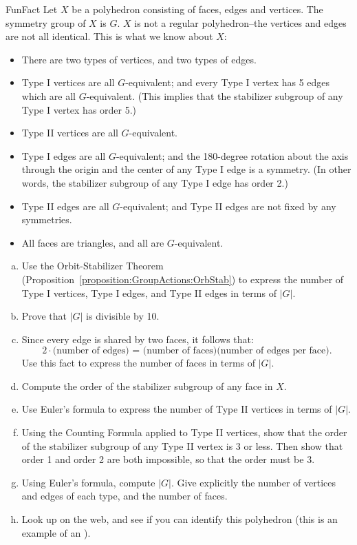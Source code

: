 \begin{exercise}{FunFact}
Let $X$ be a polyhedron consisting of faces, edges and vertices. The symmetry group of $X$ is $G$. $X$ is not a regular polyhedron--the vertices and edges are not all identical.  This is what we know about $X$:
\begin{itemize}
\item
There are two types of vertices, and two types of edges. 
\item Type I vertices are all $G$-equivalent; and every Type I vertex has 5 edges which are all $G$-equivalent. (This implies that the stabilizer subgroup of any Type I vertex has order 5.)
\item Type II vertices are all $G$-equivalent.
\item Type I edges are all $G$-equivalent; and the 180-degree rotation about the axis through the origin and the center of any Type I edge is a symmetry. (In other words, the stabilizer subgroup  of any Type I edge has order 2.)
\item Type II edges are all $G$-equivalent; and Type II edges are not fixed by any symmetries.
\item All faces are triangles, and all are $G$-equivalent.
\end{itemize}
\begin{enumerate}[(a)]
\item 
Use the Orbit-Stabilizer Theorem  (Proposition~\ref{proposition:GroupActions:OrbStab}) to express the number of Type I vertices, Type I  edges, and Type II edges in terms of $|G|$.
\item 
Prove that $|G|$ is divisible by 10.
\item
Since every edge is shared by two faces, it follows that:
\[ 2 \cdot \text{(number of edges) = (number of faces)(number of edges per face)}.\]
Use this fact to express the number of faces in terms of $|G|$.
\item
Compute the order of the stabilizer subgroup of any face in $X$.
\item
Use Euler's formula to express the number of Type II vertices in terms of $|G|$.
\item
Using the Counting Formula applied to Type II vertices, show that the order of the stabilizer subgroup of any Type II vertex is 3 or less. Then show that  order 1 and order 2 are both impossible, so that the order must be 3.
\item
Using Euler's formula, compute $|G|$. Give explicitly the number of vertices and edges of each type, and the number of faces.
\item
Look up on the web, and see if you can identify this polyhedron (this is an example of an ).
\end{enumerate}
\end{exercise}

